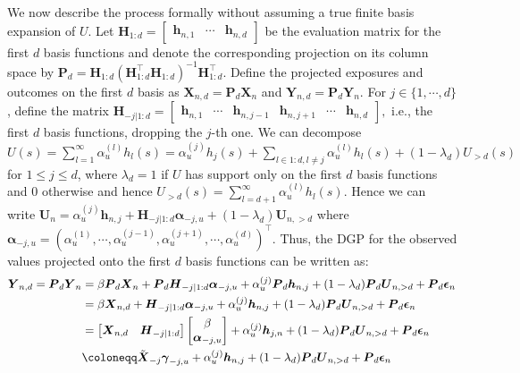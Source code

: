 \documentclass[
  12pt]{article}
\newcommand{\bX}{\boldsymbol{X}}
\newcommand{\bY}{\boldsymbol{Y}}
\newcommand{\bh}{\boldsymbol{h}}
\newcommand{\balp}{\boldsymbol{\alpha}}
\newcommand{\bU}{\boldsymbol{U}}
\newcommand{\bP}{\boldsymbol{P}}
\newcommand{\beps}{\boldsymbol{\epsilon}}
\newcommand{\bH}{\boldsymbol{H}}
\newcommand{\tilX}{\Tilde{\boldsymbol{X}}}
\newcommand{\bgam}{\boldsymbol{\gamma}}
\begin{document}
We now describe the process formally without assuming a true finite basis expansion of $U$. Let $\bH_{1:d} =\begin{bmatrix}
    \bh_{n,1} & \cdots & \bh_{n,d}
\end{bmatrix}$ be the evaluation matrix for the first $d$ basis functions and denote the corresponding projection on its column space by $\bP_d = \bH_{1:d}\left(\bH_{1:d}^\top \bH_{1:d}\right)^{-1}\bH_{1:d}^\top$. Define the projected exposures and outcomes on the first $d$ basis as $\bX_{n,d} = \bP_d\bX_n$ and $\bY_{n,d} = \bP_d\bY_n$. 
For $j \in \{1,\cdots,d\}$, 
define the matrix $
\bH_{-j|1:d} = 
\begin{bmatrix}
    \bh_{n,1} & \cdots & \bh_{n,j-1} & \bh_{n,j+1} & \cdots & \bh_{n,d} 
\end{bmatrix},
$ i.e., the first $d$ basis functions, dropping the $j$-th one. We can decompose $U(s) = \sum_{l=1}^\infty\alpha_u^{(l)}h_l(s) = \alpha_u^{(j)}h_j(s) + \sum_{l \in 1:d, l \neq j} \alpha_u^{(l)}h_l(s) + (1-\lambda_{d}) U_{>d}(s)$ for $1\leq j \leq d$, where $\lambda_{d} = 1$ if $U$ has support only on the first $d$ basis functions and 0 otherwise and hence $U_{>d}(s) = \sum_{l = d+1}^\infty\alpha_u^{(l)}h_l(s)$. Hence 
we can write $\bU_n = \alpha_u^{(j)}\bh_{n,j} + \bH_{-j|1:d}\balp_{-j,u} + (1-\lambda_{d})\bU_{n,>d}$ where $\balp_{-j,u} = \left(\alpha_u^{(1)},\cdots,\alpha_u^{(j-1)},\alpha_u^{(j+1)},\cdots,\alpha_u^{(d)}\right)^\top$. 
Thus, the DGP for the observed values projected onto the first $d$ basis functions can be written as:
\begin{equation}\label{eq:leave-one-dgp}
    \begin{split}
        \bY_{n,d} = \bP_d \bY_n & = \beta \bP_d\bX_n + \bP_d\bH_{-j|1:d}\balp_{-j,u}+ \alpha_u^{(j)}\bP_d\bh_{n,j} + (1-\lambda_{d})\bP_d\bU_{n,>d} + \bP_d\beps_n\\
        & = \beta\bX_{n,d} + \bH_{-j|1:d}\balp_{-j,u}+ \alpha_u^{(j)}\bh_{n,j} + (1-\lambda_{d})\bP_d\bU_{n,>d} + \bP_d\beps_n\\
& = \begin{bmatrix}
    \bX_{n,d} & \bH_{-j|1:d}
\end{bmatrix}\begin{bmatrix}
    \beta\\
    \balp_{-j,u}
\end{bmatrix} + \alpha_u^{(j)}\bh_{j,n} + (1-\lambda_{d})\bP_d\bU_{n,>d} + \bP_d\beps_n\\
& \coloneqq \tilX_{-j}\bgam_{-j,u} + \alpha_u^{(j)}\bh_{n,j} + (1-\lambda_{d})\bP_d\bU_{n,>d} + \bP_d\beps_n\\
    \end{split}
\end{equation}
\end{document}
